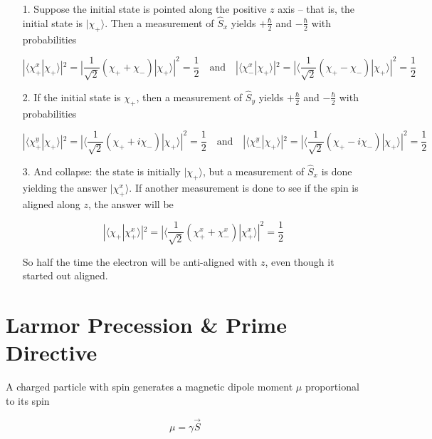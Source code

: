 \begin{itemize}
  \item[1.] Suppose the initial state is pointed along the positive $z$ axis --
    that is, the initial state is $|\chi_+\rangle$. Then a measurement of
    $\hat{S}_x$ yields $+\frac{\hbar}{2}$ and $-\frac{\hbar}{2}$ with
    probabilities 

    \[
    |\langle \chi_+^x | \chi_+\rangle |^2 = | \frac{1}{\sqrt{2}}(\chi_+
    + \chi_-)| \chi_+ \rangle|^2 = \frac{1}{2} \quad \text{and} \quad |\langle
    \chi_-^x | \chi_+\rangle |^2 = | \langle \frac{1}{\sqrt{2}} (\chi_+
    - \chi_-)|\chi_+\rangle |^2 = \frac{1}{2}
    \] \vspace{3px}
  \item[2.] If the initial state is $\chi_+$, then a measurement of $\hat{S}_y$ 
    yields $+\frac{\hbar}{2}$ and $-\frac{\hbar}{2}$ with probabilities 

    \[
    |\langle \chi_+^y | \chi_+ \rangle |^2 = | \langle \frac{1}{\sqrt{2}}
    (\chi_+ + i\chi_-) | \chi_+ \rangle |^2 = \frac{1}{2} \quad \text{and}
    \quad |\langle \chi_-^y | \chi_+ \rangle |^2 = |\langle \frac{1}{\sqrt{2}}
    (\chi_+ - i\chi_- )|\chi_+\rangle |^2 = \frac{1}{2}
    \] \vspace{3px}
    
  \item[3.] And collapse: the state is initially $|\chi_+\rangle$, but
    a measurement of $\hat{S}_x$ is done yielding the answer
    $|\chi_+^x\rangle$. If another measurement is done to see if the spin is
    aligned along $z$, the answer will be 

    \[
      |\langle \chi_+ | \chi_+^x \rangle |^2 = | \langle \frac{1}{\sqrt{2}}
      (\chi_+^x + \chi_-^x )|\chi_+^x \rangle |^2 = \frac{1}{2}
    \] \vspace{3px}
    
    So half the time the electron will be anti-aligned with $z$, even though it
    started out aligned.
\end{itemize}

\section{Larmor Precession \& Prime Directive}

A charged particle with spin generates a magnetic dipole moment $\mu$
proportional to its spin 

\[
\mu = \gamma \vec{S}
\] \vspace{3px}

